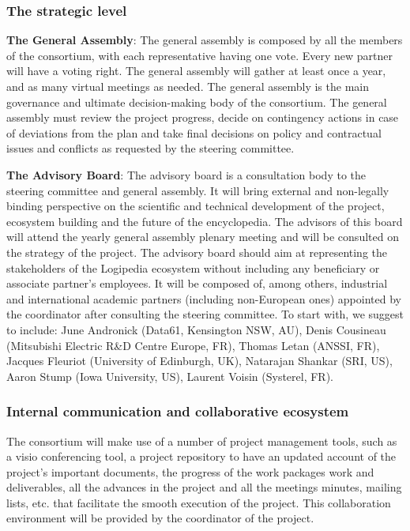 \subsubsection*{The strategic level}

\begin{compactitem}
\item{\bf The General Assembly}: The general assembly is composed by all
the members of the consortium, with each representative having one
vote. Every new partner will have a voting right. The general assembly
will gather at least once a year, and as many virtual meetings as
needed. The general assembly is the main governance and ultimate
decision-making body of the consortium. The general assembly must
review the project progress, decide on contingency actions in case of
deviations from the plan and take final decisions on policy and
contractual issues and conflicts as requested by the steering
committee.

\item{\bf The Advisory Board}: The advisory board is a consultation body to
the steering committee and general assembly. It will bring external
and non-legally binding perspective on the scientific and technical
development of the project, ecosystem building and the future of the
encyclopedia. The advisors of this board will attend the yearly
general assembly plenary meeting and will be consulted on the strategy
of the project. The advisory board should aim at representing the
stakeholders of the Logipedia ecosystem without including any
beneficiary or associate partner’s employees. It will be composed of,
among others, industrial and international academic partners
(including non-European ones) appointed by the coordinator after
consulting the steering committee. To start with, we suggest to
include: June Andronick (Data61, Kensington NSW, AU), Denis Cousineau
(Mitsubishi Electric R\&D Centre Europe, FR), Thomas Letan (ANSSI, FR),
Jacques Fleuriot (University of Edinburgh, UK), Natarajan Shankar
(SRI, US), Aaron Stump (Iowa University, US), Laurent Voisin
(Systerel, FR).
\end{compactitem}

\subsubsection*{Internal communication and collaborative ecosystem}

The consortium will make use of a number of
project management tools, such as a visio conferencing tool, a project
repository to have an updated account of the project’s important
documents, the progress of the work packages work and deliverables,
all the advances in the project and all the meetings minutes, mailing
lists, etc. that facilitate the smooth execution of the project. This
collaboration environment will be provided by the coordinator of the
project.

